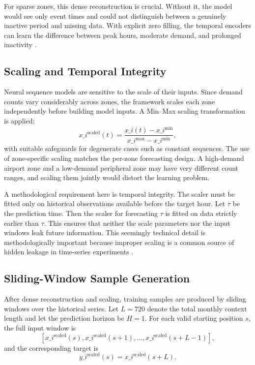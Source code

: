 \documentclass[12pt,a4paper]{report}
\begin{document}
For sparse zones, this dense reconstruction is crucial. Without it, the model would see only event times and could not distinguish between a genuinely inactive period and missing data. With explicit zero filling, the temporal encoders can learn the difference between peak hours, moderate demand, and prolonged inactivity \cite{zhuang2022sparse}.

\subsection{Scaling and Temporal Integrity}

Neural sequence models are sensitive to the scale of their inputs. Since demand counts vary considerably across zones, the framework scales each zone independently before building model inputs. A Min--Max scaling transformation is applied:
\[
x\_i^{\text{scaled}}(t)
=
\frac{x\_i(t)-x\_i^{\min}}{x\_i^{\max}-x\_i^{\min}},
\]
with suitable safeguards for degenerate cases such as constant sequences. The use of zone-specific scaling matches the per-zone forecasting design. A high-demand airport zone and a low-demand peripheral zone may have very different count ranges, and scaling them jointly would distort the learning problem.

A methodological requirement here is temporal integrity. The scaler must be fitted only on historical observations available before the target hour. Let \(\tau\) be the prediction time. Then the scaler for forecasting \(\tau\) is fitted on data strictly earlier than \(\tau\). This ensures that neither the scale parameters nor the input windows leak future information. This seemingly technical detail is methodologically important because improper scaling is a common source of hidden leakage in time-series experiments \cite{hewamalage2022pitfalls,cerqueira2020evaluating}.

\subsection{Sliding-Window Sample Generation}

After dense reconstruction and scaling, training samples are produced by sliding windows over the historical series. Let \(L = 720\) denote the total monthly context length and let the prediction horizon be \(H=1\). For each valid starting position \(s\), the full input window is
\[
[x\_i^{\text{scaled}}(s), x\_i^{\text{scaled}}(s+1), \dots, x\_i^{\text{scaled}}(s+L-1)],
\]
and the corresponding target is
\[
y\_i^{\text{scaled}}(s)
=
x\_i^{\text{scaled}}(s+L).
\]
\end{document}

